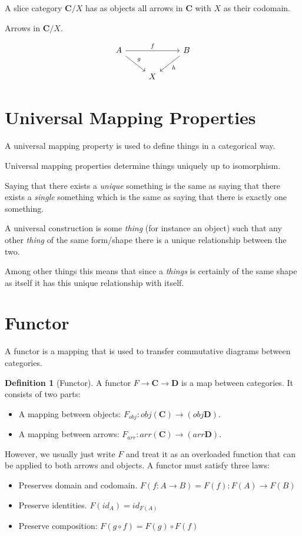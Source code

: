 \documentclass{book}
\theoremstyle{definition}
\newtheorem{definition}{Definition}[section]
\newcommand\id{\mathit{id}}
\begin{document}
A slice category $\mathbf{C}/X$ has as objects all arrows in \textbf{C} with $X$
as their codomain.

Arrows in $\mathbf{C}/X$.

\[
  \begin{tikzcd}
    A \ar[rr, "f"] \ar[dr, "g"] & & B \ar[dl, "h"] \\
    & X
  \end{tikzcd}
\]

\section{Universal Mapping Properties}

A universal mapping property is used to define things in a categorical way.

Universal mapping properties determine things uniquely up to isomorphism.

Saying that there exists a \emph{unique} something is the same as saying that
there exists a \emph{single} something which is the same as saying that there is
exactly one something.

A universal construction is some \textit{thing} (for instance an object) such
that any other \textit{thing} of the same form/shape there is a unique
relationship between the two.

Among other things this means that since a \textit{things} is certainly of the
same shape as itself it has this unique relationship with itself.

\section{Functor}

A functor is a mapping that is used to transfer commutative diagrams between
categories.

\begin{definition}[Functor]
  A functor $F \to \mathbf{C} \to \mathbf{D}$ is a map between categories. It
  consists of two parts:
  \begin{itemize}
  \item A mapping between objects:
    $F_{obj} : obj(\mathbf{C}) \to (obj\mathbf{D})$.
  \item A mapping between arrows:
    $F_{arr} : arr(\mathbf{C}) \to (arr\mathbf{D})$.
  \end{itemize}
  However, we usually just write $F$ and treat it as an overloaded function that
  can be applied to both arrows and objects. A functor must satisfy three laws:
  \begin{itemize}
  \item Preserves domain and codomain. $F(f : A \to B) = F(f) : F(A) \to F(B)$
  \item Preserve identities. $F(\id_A) = \id_{F(A)}$
  \item Preserve composition: $F(g \circ f) = F(g) \circ F(f)$
  \end{itemize}
\end{definition}
\end{document}
